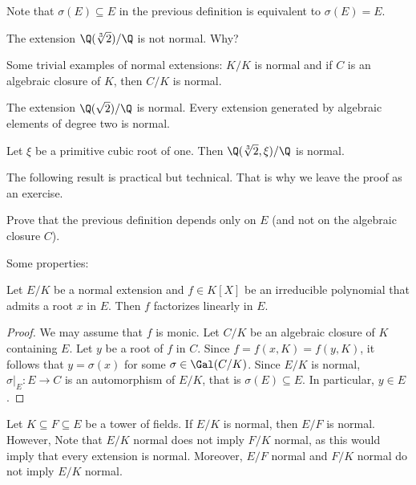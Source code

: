 Note that $\sigma(E)\subseteq E$ in the previous definition
is equivalent to $\sigma(E)=E$. 

\begin{example}
    The extension $\Q(\sqrt[3]{2})/\Q$ is not normal. Why?
\end{example}

Some trivial examples of normal extensions: $K/K$ is normal
and if $C$ is an algebraic closure of $K$, then $C/K$ is normal. 

\begin{example}
    The extension $\Q(\sqrt{2})/\Q$ is normal. 
    Every extension generated by algebraic elements of degree two is normal. 
\end{example}

\begin{exercise}
\label{xca:Q(sqrt[3]{2},xi) normal}
    Let $\xi$ be a primitive cubic root of one. Then 
    $\Q(\sqrt[3]{2},\xi)/\Q$ is normal. 
\end{exercise}

The following result is practical but technical. That is why we leave the proof
as an exercise. 

\begin{exercise}
    Prove that the previous definition depends only on $E$ (and not on the
    algebraic closure $C$). 
\end{exercise}

Some properties:

\begin{proposition}
\label{pro:linear_factorization}
    Let $E/K$ be a normal extension and $f\in K[X]$ be an irreducible polynomial
    that admits a root $x$ in $E$. Then $f$ factorizes
    linearly in $E$.
\end{proposition}

\begin{proof}
    We may assume that $f$ is monic. Let $C/K$ be an algebraic closure of $K$ containing $E$. 
    Let $y$ be a root of $f$ in $C$. Since $f=f(x,K)=f(y,K)$, 
    it follows that $y=\sigma(x)$ for some $\sigma\in\Gal(C/K)$. Since 
    $E/K$ is normal, $\sigma|_E\colon E\to C$ is an automorphism of $E/K$, that is
    $\sigma(E)\subseteq E$. In particular, $y\in E$. 
\end{proof}

Let $K\subseteq F\subseteq E$ be a tower of fields. 
If $E/K$ is normal, then $E/F$ is normal. However, 
Note that $E/K$ normal does not imply $F/K$ normal, as this would imply 
that every extension is normal. Moreover, 
$E/F$ normal and $F/K$ normal do not imply $E/K$ normal.
    
